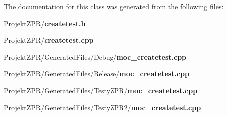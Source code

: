 The documentation for this class was generated from the following files\-:\begin{DoxyCompactItemize}
\item 
Projekt\-Z\-P\-R/{\bf createtest.\-h}\item 
Projekt\-Z\-P\-R/{\bf createtest.\-cpp}\item 
Projekt\-Z\-P\-R/\-Generated\-Files/\-Debug/{\bf moc\-\_\-createtest.\-cpp}\item 
Projekt\-Z\-P\-R/\-Generated\-Files/\-Release/{\bf moc\-\_\-createtest.\-cpp}\item 
Projekt\-Z\-P\-R/\-Generated\-Files/\-Testy\-Z\-P\-R/{\bf moc\-\_\-createtest.\-cpp}\item 
Projekt\-Z\-P\-R/\-Generated\-Files/\-Testy\-Z\-P\-R2/{\bf moc\-\_\-createtest.\-cpp}\end{DoxyCompactItemize}
